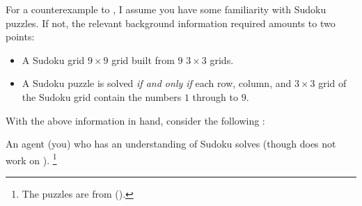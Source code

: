 \begin{note}
  For a counterexample to \issueInclusion{}, I assume you have some familiarity with Sudoku puzzles.
  If not, the relevant background information required amounts to two points:
  \begin{itemize}
  \item
    A Sudoku grid \(9 \times 9\) grid built from \(9\) \(3 \times 3\) grids.
  \item
    A Sudoku puzzle is solved \emph{if and only if} each row, column, and \(3 \times 3\) grid of the Sudoku grid contain the numbers \(1\) through to \(9\).
  \end{itemize}
  With the above information in hand, consider the following :

  \begin{scenario}%
    \label{illu:gist:sudoku}%
    An agent (you) who has an understanding of Sudoku solves \sudokuPuzL{} (though does not work on \sudokuPuzR{}).%
    \footnote{
      The puzzles are from (\cite[54,56]{Coussement:2007up}).
    }
    \bigskip


\end{scenario}
\end{note}
